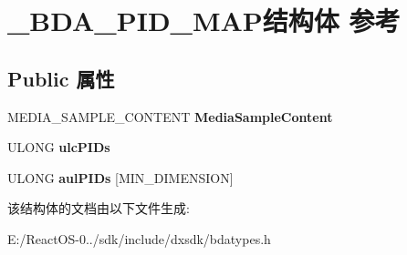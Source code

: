 \hypertarget{struct___b_d_a___p_i_d___m_a_p}{}\section{\+\_\+\+B\+D\+A\+\_\+\+P\+I\+D\+\_\+\+M\+A\+P结构体 参考}
\label{struct___b_d_a___p_i_d___m_a_p}
\subsection*{Public 属性}
\begin{DoxyCompactItemize}
\item 
\mbox{\label{struct___b_d_a___p_i_d___m_a_p_a5e9ba46ce44f231b0f4265c3a6f50e7c}} 
M\+E\+D\+I\+A\+\_\+\+S\+A\+M\+P\+L\+E\+\_\+\+C\+O\+N\+T\+E\+NT {\bfseries Media\+Sample\+Content}
\item 
\mbox{\label{struct___b_d_a___p_i_d___m_a_p_a94c7c6093e1dc69c2f193d6cae44259b}} 
U\+L\+O\+NG {\bfseries ulc\+P\+I\+Ds}
\item 
\mbox{\label{struct___b_d_a___p_i_d___m_a_p_ab438f889e08dc9be81ed1e7e40b76bc1}} 
U\+L\+O\+NG {\bfseries aul\+P\+I\+Ds} \mbox{[}M\+I\+N\+\_\+\+D\+I\+M\+E\+N\+S\+I\+ON\mbox{]}
\end{DoxyCompactItemize}


该结构体的文档由以下文件生成\+:\begin{DoxyCompactItemize}
\item 
E\+:/\+React\+O\+S-\/0../sdk/include/dxsdk/bdatypes.\+h\end{DoxyCompactItemize}
